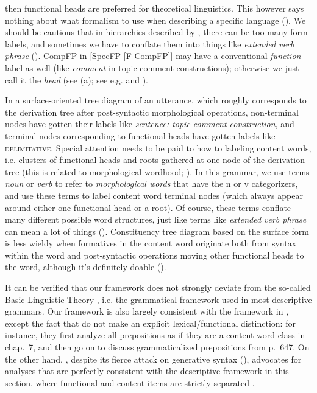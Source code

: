 \documentclass[UTF8, a4paper, oneside, scheme=plain, 12pt]{ctexrep}
\newcommand*{\citechap}[1]{chap.~{#1}}
\newcommand*{\citepage}[1]{p.~{#1}}
\newcommand*{\term}[1]{\emph{#1}}
\newcommand{\form}[1]{\emph{#1}}
\newcommand*{\category}[1]{\textsc{#1}}
\begin{document}
{\begin{itemize}
{        then functional heads are preferred for theoretical linguistics.
        This however says nothing about what formalism to use 
        when describing a specific language ().
    }
    We should be cautious that in hierarchies described by \citet{cinque1999adverbs},
    there can be too many form labels,
    and sometimes we have to conflate them into things like \form{extended verb phrase}
    ().
    CompFP in [SpecFP [F CompFP]] may have a conventional \emph{function} label as well
    (like \form{comment} in topic-comment constructions);
    otherwise we just call it the \term{head} (see (a); see e.g.  and ).

    In a surface-oriented tree diagram of an utterance,
    which roughly corresponds to the derivation tree after post-syntactic morphological operations,
    non-terminal nodes have gotten their labels like \term{sentence: topic-comment construction},
    and terminal nodes corresponding to functional heads have gotten labels like \category{delimitative}.
    Special attention needs to be paid to how to labeling content words,
    i.e. clusters of functional heads and roots gathered at one node of the derivation tree
    (this is related to morphological wordhood; ).
    In this grammar, we use terms \term{noun} or \term{verb}
    to refer to \emph{morphological words} that have the n or v categorizers,
    and use these terms to label content word terminal nodes (which always appear around either one functional head or a root).
    Of course, these terms conflate many different possible word structures,
    just like terms like \term{extended verb phrase} can mean a lot of things
    ().
    Constituency tree diagram based on the surface form is
    less wieldy when formatives in the content word
    originate both from syntax within the word and post-syntactic operations moving 
    other functional heads to the word,
    although it's definitely doable ().
\end{itemize}

It can be verified that our framework does not strongly deviate from the so-called Basic Linguistic Theory
\citep{dixon2009basic},
i.e. the grammatical framework used in most descriptive grammars.
Our framework is also largely consistent with the framework in \citet{cgel},
except the fact that \citet{cgel} do not make an explicit lexical/functional distinction:
for instance, they first analyze all prepositions as if they are a content word class
in \citechap{7},
and then go on to discuss grammaticalized prepositions from \citepage{647}.
On the other hand, \citet{dixon2009basic}, despite its fierce attack on generative syntax
(),
advocates for analyses that are perfectly consistent with the descriptive framework in this section,
where functional and content items are strictly separated
\citep[\citepage{49}]{dixon2009basic}.

}
\end{document}
